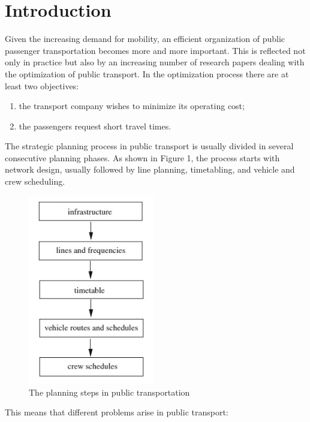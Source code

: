 \documentclass[
  twoside,
  11pt, a4paper,
  footinclude=true,
  headinclude=true,
  cleardoublepage=empty
]{book}
\theoremstyle{definition}
\begin{document}
\chapter{Introduction}
Given the increasing demand for mobility, an efficient organization of public passenger transportation becomes more and more important. This is reflected not only in practice but also by an increasing number of research papers dealing with the optimization of public transport. In the optimization process there are at least two objectives:
\begin{enumerate}
\item the transport company wishes to minimize its operating cost;
\item the passengers request short travel times.
\end{enumerate}
The strategic planning process in public transport is usually divided in several consecutive planning phases. As shown in Figure 1, the process starts with network design, usually followed by line planning, timetabling, and vehicle and crew scheduling.
\begin{figure}[htbp]
\centering
\includegraphics[width=5.5cm]{phases.jpg}%
\caption{\small The planning steps in public transportation}
\end{figure}
This means that different problems arise in public transport: 
\end{document}

